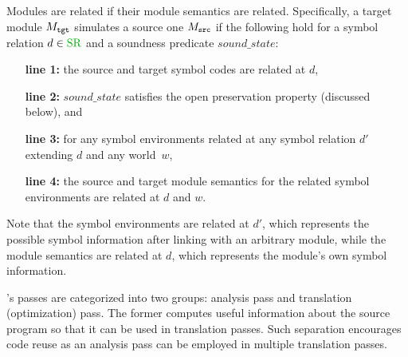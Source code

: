 Modules are related if their module semantics are related. Specifically,
a target module $M_{\texttt{tgt}}$ simulates a source one $M_{\texttt{src}}$
if the following hold for a symbol relation $d \in \SREL$ and a soundness predicate $sound\_state$:
\begin{itemize}[leftmargin=11mm]
\item[\textbf{line 1:}] the source and target symbol codes are related at $d$,
\item[\textbf{line 2:}] $sound\_state$ satisfies the open preservation property (discussed below), and
\item[\textbf{line 3:}] for any symbol environments related at any symbol relation $d'$ extending $d$ and any world~$w$,
\item[\textbf{line 4:}] the source and target module semantics for the related symbol environments are related at $d$ and $w$.
\end{itemize}
Note that the symbol environments are related at $d'$, which represents the possible symbol information after linking with an arbitrary module,
while the module semantics are related at $d$, which represents the module's own symbol information.


\label{sec:main-verification:openprsv}
\cc{}'s passes are categorized into two groups: analysis pass and translation (optimization) pass.
The former computes useful information about the source program so that it can be used in translation passes.
Such separation encourages code reuse as an analysis pass can be employed in multiple translation passes.

